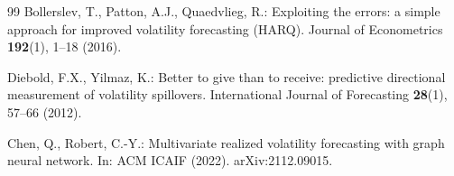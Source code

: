 \documentclass[runningheads]{llncs}
\begin{document}
\begin{thebibliography}{99}
Bollerslev, T., Patton, A.J., Quaedvlieg, R.: Exploiting the errors: a simple approach for improved
volatility forecasting (HARQ). Journal of Econometrics \textbf{192}(1), 1--18 (2016).

Diebold, F.X., Yilmaz, K.: Better to give than to receive: predictive directional measurement of
volatility spillovers. International Journal of Forecasting \textbf{28}(1), 57--66 (2012).

Chen, Q., Robert, C.-Y.: Multivariate realized volatility forecasting with graph neural network.
In: ACM ICAIF (2022). arXiv:2112.09015.

\end{thebibliography}
\end{document}

